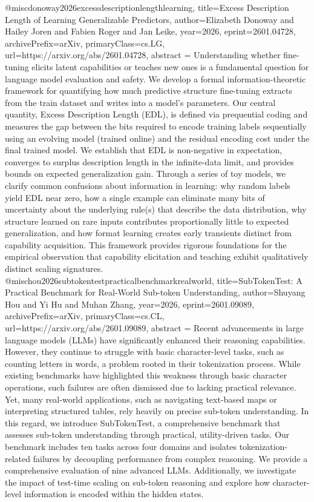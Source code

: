 {}@misc{donoway2026excessdescriptionlengthlearning,
      title={Excess Description Length of Learning Generalizable Predictors}, 
      author={Elizabeth Donoway and Hailey Joren and Fabien Roger and Jan Leike},
      year={2026},
      eprint={2601.04728},
      archivePrefix={arXiv},
      primaryClass={cs.LG},
      url={https://arxiv.org/abs/2601.04728},
      abstract = {Understanding whether fine-tuning elicits latent capabilities or teaches new ones is a fundamental question for language model evaluation and safety. We develop a formal information-theoretic framework for quantifying how much predictive structure fine-tuning extracts from the train dataset and writes into a model's parameters. Our central quantity, Excess Description Length (EDL), is defined via prequential coding and measures the gap between the bits required to encode training labels sequentially using an evolving model (trained online) and the residual encoding cost under the final trained model. We establish that EDL is non-negative in expectation, converges to surplus description length in the infinite-data limit, and provides bounds on expected generalization gain. Through a series of toy models, we clarify common confusions about information in learning: why random labels yield EDL near zero, how a single example can eliminate many bits of uncertainty about the underlying rule(s) that describe the data distribution, why structure learned on rare inputs contributes proportionally little to expected generalization, and how format learning creates early transients distinct from capability acquisition. This framework provides rigorous foundations for the empirical observation that capability elicitation and teaching exhibit qualitatively distinct scaling signatures.}
}@misc{hou2026subtokentestpracticalbenchmarkrealworld,
      title={SubTokenTest: A Practical Benchmark for Real-World Sub-token Understanding}, 
      author={Shuyang Hou and Yi Hu and Muhan Zhang},
      year={2026},
      eprint={2601.09089},
      archivePrefix={arXiv},
      primaryClass={cs.CL},
      url={https://arxiv.org/abs/2601.09089},
      abstract = {Recent advancements in large language models (LLMs) have significantly enhanced their reasoning capabilities. However, they continue to struggle with basic character-level tasks, such as counting letters in words, a problem rooted in their tokenization process. While existing benchmarks have highlighted this weakness through basic character operations, such failures are often dismissed due to lacking practical relevance. Yet, many real-world applications, such as navigating text-based maps or interpreting structured tables, rely heavily on precise sub-token understanding. In this regard, we introduce SubTokenTest, a comprehensive benchmark that assesses sub-token understanding through practical, utility-driven tasks. Our benchmark includes ten tasks across four domains and isolates tokenization-related failures by decoupling performance from complex reasoning. We provide a comprehensive evaluation of nine advanced LLMs. Additionally, we investigate the impact of test-time scaling on sub-token reasoning and explore how character-level information is encoded within the hidden states.}
}
